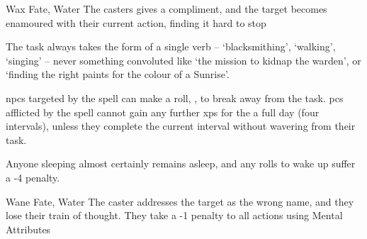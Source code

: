   {}%
  {Wax}%
  {Fate, Water}%
  {}%
  {The casters gives a compliment, and the target becomes enamoured with their current action, finding it hard to stop}%
  {
    The task always takes the form of a single verb -- `blacksmithing', `walking', `singing' -- never something convoluted like `the mission to kidnap the warden', or `finding the right paints for the colour of a Sunrise'.

    \Glspl{npc} targeted by the spell can make a  roll, \tn[8], to break away from the task.
    \Glspl{pc} afflicted by the spell cannot gain any further \glspl{xp} for the a full day (four \glspl{interval}), unless they complete the current \gls{interval} without wavering from their task.

  Anyone sleeping almost certainly remains asleep, and any rolls to wake up suffer a -4 penalty.}

  {}%
  {Wane}%
  {Fate, Water}%
  {}%
  {The caster addresses the target as the wrong name, and they lose their train of thought.
    They take a -1 penalty to all actions using Mental Attributes}%
  {}

